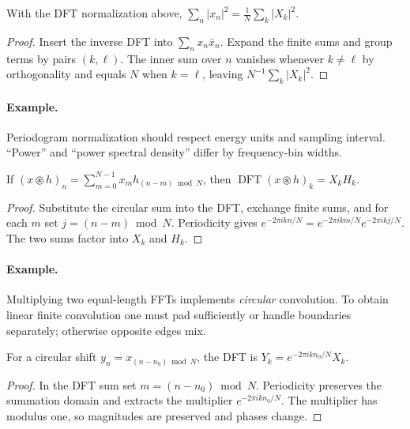 \begin{proposition}With the DFT normalization above, $\sum_n|x_n|^2=\frac1N\sum_k|X_k|^2$.\end{proposition}
\begin{proof}Insert the inverse DFT into $\sum_n x_n\bar x_n$. Expand the finite sums and group terms by pairs $(k,\ell)$. The inner sum over $n$ vanishes whenever $k\ne\ell$ by orthogonality and equals $N$ when $k=\ell$, leaving $N^{-1}\sum_k|X_k|^2$.\end{proof}
\paragraph{Example.} Periodogram normalization should respect energy units and sampling interval. ``Power'' and ``power spectral density'' differ by frequency-bin widths.

\begin{proposition}If $(x\circledast h)_n=\sum_{m=0}^{N-1}x_mh_{(n-m)\bmod N}$, then $\operatorname{DFT}(x\circledast h)_k=X_kH_k$.\end{proposition}
\begin{proof}Substitute the circular sum into the DFT, exchange finite sums, and for each $m$ set $j=(n-m)\bmod N$. Periodicity gives $e^{-2\pi ikn/N}=e^{-2\pi ikm/N}e^{-2\pi ikj/N}$. The two sums factor into $X_k$ and $H_k$.\end{proof}
\paragraph{Example.} Multiplying two equal-length FFTs implements \emph{circular} convolution. To obtain linear finite convolution one must pad sufficiently or handle boundaries separately; otherwise opposite edges mix.

\begin{proposition}For a circular shift $y_n=x_{(n-n_0)\bmod N}$, the DFT is $Y_k=e^{-2\pi ikn_0/N}X_k$.\end{proposition}
\begin{proof}In the DFT sum set $m=(n-n_0)\bmod N$. Periodicity preserves the summation domain and extracts the multiplier $e^{-2\pi ikn_0/N}$. The multiplier has modulus one, so magnitudes are preserved and phases change.\end{proof}

